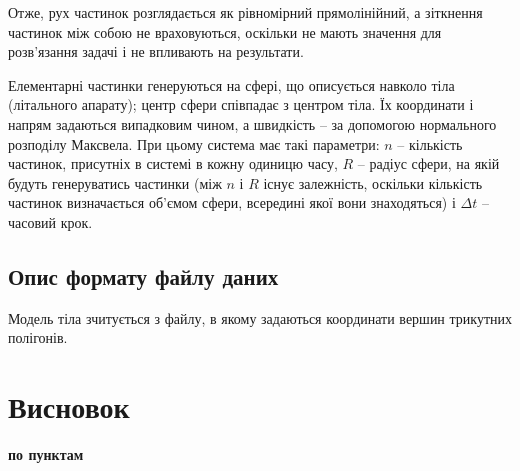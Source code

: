 \documentclass[a4paper,12pt]{article}
\begin{document}
Отже, рух частинок розглядається як рівномірний прямолінійний, а зіткнення частинок між собою не враховуються, оскільки не мають значення для розв’язання задачі і не впливають на результати.

Елементарні частинки генеруються на сфері, що описується навколо тіла (літального апарату); центр сфери співпадає з центром тіла. Їх координати і напрям задаються випадковим чином, а швидкість -- за допомогою нормального розподілу Максвела. При цьому система має такі параметри: $n$ -- кількість частинок, присутніх в системі в кожну одиницю часу, $R$ -- радіус сфери, на якій будуть генеруватись частинки (між $n$ і $R$ існує залежність, оскільки кількість частинок визначається об’ємом сфери, всередині якої вони знаходяться) і $\Delta t$ -- часовий крок.

\subsection{Опис формату файлу даних}
Модель тіла зчитується з файлу, в якому задаються координати вершин трикутних полігонів.

\newpage

\section*{Висновок}
\textbf{по пунктам}

\newpage
\end{document}
